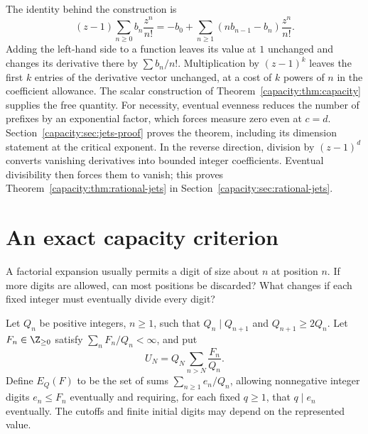 \documentclass[11pt]{article}
\begin{document}
The identity behind the construction is
\[
 (z-1)\sum_{n\ge0}b_n\frac{z^n}{n!}
 =-b_0+\sum_{n\ge1}(n b_{n-1}-b_n)\frac{z^n}{n!}.
 \tag{J}\label{capacity:eq:jet-carry}
\]
Adding the left-hand side to a function leaves its value at $1$ unchanged
and changes its derivative there by
$\sum b_n/n!$. Multiplication by $(z-1)^k$ leaves the first $k$ entries of
the derivative vector unchanged, at a cost of $k$ powers of $n$ in the
coefficient allowance. The scalar construction of
Theorem~\ref{capacity:thm:capacity} supplies the free quantity.
For necessity, eventual evenness reduces the number of prefixes by an
exponential factor, which forces measure zero even at $c=d$.
Section~\ref{capacity:sec:jets-proof} proves the theorem, including its
dimension statement at the critical exponent. In the reverse direction,
division by $(z-1)^d$ converts vanishing derivatives into bounded integer
coefficients. Eventual divisibility then forces them to vanish; this proves
Theorem~\ref{capacity:thm:rational-jets} in
Section~\ref{capacity:sec:rational-jets}.


\section{An exact capacity criterion}\label{capacity:sec:criterion}
A factorial expansion usually permits a digit of size about $n$ at position
$n$. If more digits are allowed, can most positions be discarded? What changes
if each fixed integer must eventually divide every digit?

Let $Q_n$ be positive integers, $n\ge1$, such that $Q_n\mid Q_{n+1}$ and
$Q_{n+1}\ge2Q_n$. Let $F_n\in\Z_{\ge0}$ satisfy
$\sum_nF_n/Q_n<\infty$, and put
\[
 U_N=Q_N\sum_{n>N}\frac{F_n}{Q_n}.
 \tag{C}\label{capacity:eq:capacity}
\]
Define $E_Q(F)$ to be the set of sums $\sum_{n\ge1}e_n/Q_n$, allowing
nonnegative integer digits $e_n\le F_n$ eventually and requiring, for each
fixed $q\ge1$, that $q\mid e_n$ eventually. The cutoffs and finite initial
digits may depend on the represented value.
\end{document}
